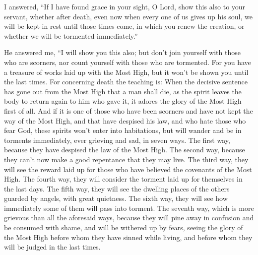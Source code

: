  I answered, ``If I have found grace in your sight, O Lord,
show this also to your servant, whether after death, even now when every
one of us gives up his soul, we will be kept in rest until those times
come, in which you renew the creation, or whether we will be tormented
immediately.''

 He answered me, ``I will show you this also; but don't
join yourself with those who are scorners, nor count yourself with those
who are tormented.  For you have a treasure of works laid
up with the Most High, but it won't be shown you until the last times.
 For concerning death the teaching is: When the decisive
sentence has gone out from the Most High that a man shall die, as the
spirit leaves the body to return again to him who gave it, it adores the
glory of the Most High first of all.  And if it is one of
those who have been scorners and have not kept the way of the Most High,
and that have despised his law, and who hate those who fear God,
 these spirits won't enter into habitations, but will
wander and be in torments immediately, ever grieving and sad, in seven
ways.  The first way, because they have despised the law of
the Most High.  The second way, because they can't now make
a good repentance that they may live.  The third way, they
will see the reward laid up for those who have believed the covenants of
the Most High.  The fourth way, they will consider the
torment laid up for themselves in the last days.  The fifth
way, they will see the dwelling places of the others guarded by angels,
with great quietness.  The sixth way, they will see how
immediately some of them will pass into torment.  The
seventh way, which is more grievous than all the aforesaid ways, because
they will pine away in confusion and be consumed with shame, and will be
withered up by fears, seeing the glory of the Most High before whom they
have sinned while living, and before whom they will be judged in the
last times.

